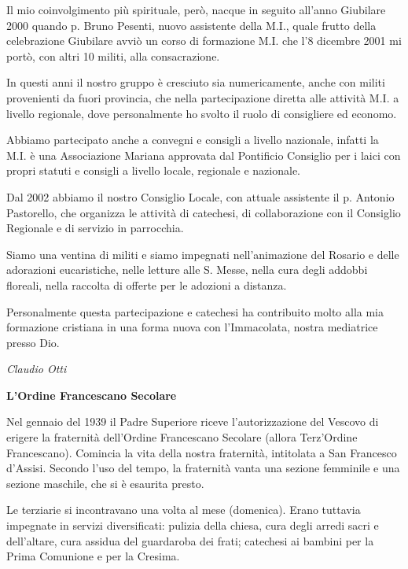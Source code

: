 Il mio coinvolgimento più spirituale, però, nacque in seguito all’anno Giubilare 2000 quando p. 
Bruno Pesenti, nuovo assistente della M.I., quale frutto della celebrazione Giubilare avviò un corso 
di formazione M.I. che l’8 dicembre 2001 mi portò, con altri 10 militi, alla consacrazione.

In questi anni il nostro gruppo è cresciuto sia numericamente, anche con militi provenienti da fuori 
provincia, che nella partecipazione diretta alle attività M.I. a livello regionale, dove personalmente 
ho svolto il ruolo di consigliere ed economo.

Abbiamo partecipato anche a convegni e consigli a livello nazionale, infatti la M.I. è una 
Associazione Mariana approvata dal Pontificio Consiglio per i laici con propri statuti e consigli a 
livello locale, regionale e nazionale.

Dal 2002 abbiamo il nostro Consiglio Locale, con attuale assistente il p. Antonio Pastorello, che 
organizza le attività di catechesi, di collaborazione con il Consiglio Regionale e di servizio in 
parrocchia.

Siamo una ventina di militi e siamo impegnati nell’animazione del Rosario e delle adorazioni 
eucaristiche, nelle letture alle S. Messe, nella cura degli addobbi floreali, nella raccolta di offerte 
per le adozioni a distanza.

Personalmente questa partecipazione e catechesi ha contribuito molto alla mia formazione cristiana 
in una forma nuova con l’Immacolata, nostra mediatrice presso Dio.
\begin{flushright}
\textit{Claudio Otti}
\end{flushright}
\bigskip
{}
{}
\begin{center}
\textbf{\Large L'Ordine Francescano Secolare}
\end{center}
\bigbreak
Nel gennaio del 1939 il Padre Superiore riceve l'autorizzazione del Vescovo di erigere la fraternità 
dell'Ordine Francescano Secolare (allora Terz’Ordine Francescano). Comincia la vita della nostra 
fraternità, intitolata a San Francesco d'Assisi. 
Secondo l'uso del tempo, la fraternità vanta una sezione femminile e  una sezione maschile, che si 
è esaurita presto. 

Le terziarie si incontravano una volta al mese (domenica). Erano tuttavia impegnate in servizi 
diversificati: pulizia della chiesa, cura degli arredi sacri e dell'altare, cura assidua del guardaroba 
dei frati; catechesi ai bambini per la Prima Comunione e per la Cresima. 

